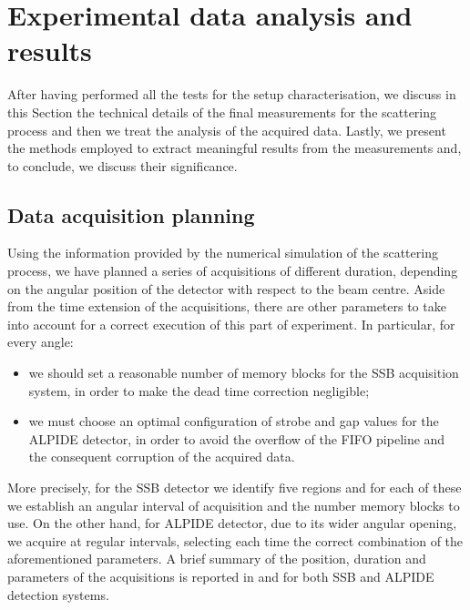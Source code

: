 \documentclass[../../main/main.tex]{subfiles}
\begin{document}
\section{Experimental data analysis and results}
After having performed all the tests for the setup characterisation, we discuss in this Section the technical details of the final measurements for the scattering process and then we treat the analysis of the acquired data. Lastly, we present the methods employed to extract meaningful results from the measurements and, to conclude, we discuss their significance.



\subsection{Data acquisition planning}
Using the information provided by the numerical simulation of the scattering process, we have planned a series of acquisitions of different duration, depending on the angular position of the detector with respect to the beam centre.
Aside from the time extension of the acquisitions, there are other parameters to take into account for a correct execution of this part of experiment. In particular, for every angle:
\begin{itemize}
    \item we should set a reasonable number of memory blocks for the SSB acquisition system, in order to make the dead time correction negligible;
    \item we must choose an optimal configuration of strobe and gap values for the ALPIDE detector, in order to avoid the overflow of the FIFO pipeline and the consequent corruption of the acquired data.
\end{itemize}
More precisely, for the SSB detector we identify five regions and for each of these we establish an angular interval of acquisition and the number memory blocks to use.
On the other hand, for ALPIDE detector, due to its wider angular opening, we acquire at regular intervals, selecting each time the correct combination of the aforementioned parameters.
A brief summary of the position, duration and parameters of the acquisitions is reported in  and  for both SSB and ALPIDE detection systems.
\end{document}
